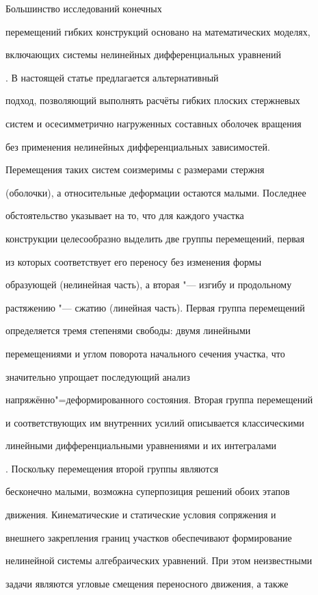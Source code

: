  Большинство исследований конечных

перемещений гибких конструкций основано на математических моделях,

включающих системы нелинейных дифференциальных уравнений

\cite{elen:bib1,elen:bib2}. В настоящей статье предлагается альтернативный

подход, позволяющий выполнять расчёты гибких плоских стержневых

систем и осесимметрично нагруженных составных оболочек вращения

без применения нелинейных дифференциальных зависимостей.

Перемещения таких систем соизмеримы с размерами стержня

(оболочки), а относительные деформации остаются малыми. Последнее

обстоятельство указывает на то, что для каждого участка

конструкции целесообразно выделить две группы перемещений, первая

из которых соответствует его переносу без изменения формы

образующей (нелинейная часть), а вторая "--- изгибу и продольному

растяжению "--- сжатию (линейная часть). Первая группа перемещений

определяется тремя степенями свободы: двумя линейными

перемещениями и углом поворота начального сечения участка, что

значительно упрощает последующий анализ

напряжённо"=деформированного состояния. Вторая группа перемещений

и соответствующих им внутренних усилий описывается классическими

линейными дифференциальными уравнениями и их интегралами

\cite{elen:bib3}. Поскольку перемещения второй группы являются

бесконечно малыми, возможна суперпозиция решений обоих этапов

движения. Кинематические и статические условия сопряжения и

внешнего закрепления границ участков обеспечивают формирование

нелинейной системы алгебраических уравнений. При этом неизвестными

задачи являются угловые смещения переносного движения, а также

